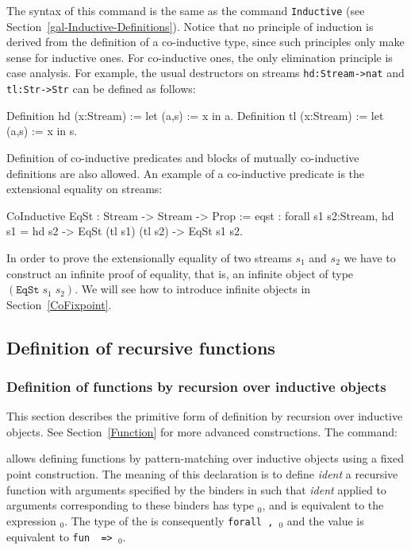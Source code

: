 The syntax of this command is the same as the command \texttt{Inductive}
(see Section~\ref{gal-Inductive-Definitions}). Notice that no
principle of induction is derived from the definition of a
co-inductive type, since such principles only make sense for inductive
ones. For co-inductive ones, the only elimination principle is case
analysis. For example, the usual destructors on streams
\texttt{hd:Stream->nat} and \texttt{tl:Str->Str} can be defined as
follows:
\begin{coq_example}
Definition hd (x:Stream) := let (a,s) := x in a.
Definition tl (x:Stream) := let (a,s) := x in s.
\end{coq_example}

Definition of co-inductive predicates and blocks of mutually
co-inductive definitions are also allowed. An example of a
co-inductive predicate is the extensional equality on streams:

\begin{coq_example}
CoInductive EqSt : Stream -> Stream -> Prop :=
    eqst :
      forall s1 s2:Stream,
        hd s1 = hd s2 -> EqSt (tl s1) (tl s2) -> EqSt s1 s2.
\end{coq_example}

In order to prove the extensionally equality of two streams $s_1$ and
$s_2$ we have to construct an infinite proof of equality, that is,
an infinite object of type $(\texttt{EqSt}\;s_1\;s_2)$. We will see
how to introduce infinite objects in Section~\ref{CoFixpoint}.

\subsection{Definition of recursive functions}

\subsubsection{Definition of functions by recursion over inductive objects}

This section describes the primitive form of definition by recursion
over inductive objects. See Section~\ref{Function} for more advanced
constructions. The command:
\begin{center}
\end{center}
allows defining functions by pattern-matching over inductive objects 
using a fixed point construction.
The meaning of this declaration is to define {\it ident} a recursive
function with arguments specified by the binders in {\params} such
that {\it ident} applied to arguments corresponding to these binders
has type \type$_0$, and is equivalent to the expression \term$_0$. The
type of the {\ident} is consequently {\tt forall {\params} {\tt,}
  \type$_0$} and the value is equivalent to {\tt fun {\params} {\tt
    =>} \term$_0$}.

